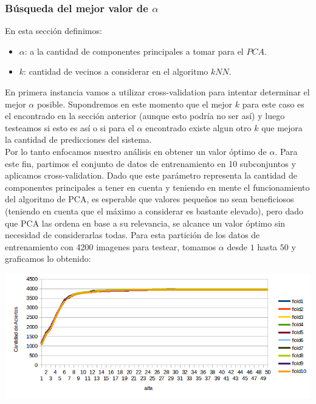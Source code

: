 \subsubsection{Búsqueda del mejor valor de $\alpha$}
En esta sección definimos:
\begin{itemize}
	\item $\alpha$: a la cantidad de componentes principales a tomar para el $PCA$.
	\item $k$: cantidad de vecinos a considerar en el algoritmo $kNN$.
\end{itemize}
En primera instancia vamos a utilizar cross-validation para intentar determinar el mejor $\alpha$ posible. Supondremos en este momento que el mejor $k$ para este caso es el encontrado en la sección anterior (aunque esto podría no ser así) y luego testeamos si esto es así o si para el $\alpha$ encontrado existe algun otro $k$ que mejora la cantidad de predicciones del sistema.
\\
Por lo tanto enfocamos nuestro análisis en obtener un valor óptimo de $\alpha$. Para este fin, partimos el conjunto de datos de entrenamiento en 10 subconjuntos y aplicamos cross-validation. Dado que este parámetro representa la cantidad de componentes principales a tener en cuenta y teniendo en mente el funcionamiento del algoritmo de PCA, es esperable que valores pequeños no sean beneficiosos (teniendo en cuenta que el máximo a considerar es bastante elevado), pero dado que PCA las ordena en base a su relevancia, se alcance un valor óptimo sin necesidad de considerarlas todas. Para esta partición de los datos de entrenamiento con 4200 imagenes para testear, tomamos $\alpha$ desde $1$ hasta $50$ y graficamos lo obtenido:

\begin{center}
\includegraphics[scale=0.6]{nuevosResultados/pca/alfa/1.png}
\end{center}

